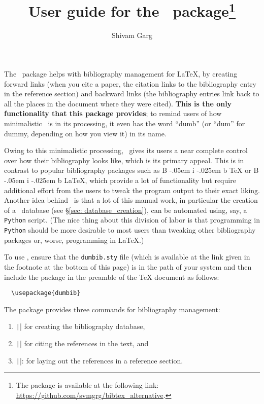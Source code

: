 \documentclass[letter, 12pt]{article}
\title{User guide for the \dumbib\ package\footnote{The package is available at the following link: \url{https://github.com/svmgrg/bibtex_alternative}.}}
\author{Shivam Garg}
\def\Bib{%
  {%
    \rm
    B%
    \kern-.05em%
    {%
      \sc
      i%
      \kern-.025em %
      b%
    }%
  }%
}
\begin{document}
\maketitle

The \dumbib\ package helps with bibliography management for \LaTeX{}, by creating forward links (when you cite a paper, the citation links to the bibliography entry in the reference section) and backward links (the bibliography entries link back to all the places in the document where they were cited). \textbf{This is the only functionality that this package provides}; to remind users of how minimalistic \dumbib\ is in its processing, it even has the word ``dumb'' (or ``dum'' for dummy, depending on how you view it) in its name.

Owing to this minimalistic processing, \dumbib\ gives its users a near complete control over how their bibliography looks like, which is its primary appeal. This is in contrast to popular bibliography packages such as \Bib\TeX{} or \Bib\LaTeX, which provide a lot of functionality but require additional effort from the users to tweak the program output to their exact liking. Another idea behind \dumbib\ is that a lot of this manual work, in particular the creation of a \dumbib\ database (see \S \ref{sec: database_creation}), can be automated using, say, a \texttt{Python} script. (The nice thing about this division of labor is that programming in \texttt{Python} should be more desirable to most users than tweaking other bibliography packages or, worse, programming in \LaTeX.)

To use \dumbib, ensure that the \texttt{dumbib.sty} file (which is available at the link given in the footnote at the bottom of this page) is in the path of your system and then include the package in the preamble of the \TeX{} document as follows:
\begin{verbatim}
  \usepackage{dumbib}
\end{verbatim}
The package provides three commands for bibliography management:
\begin{enumerate}
\item \texttt|\dumbibReferenceEntry{}| for creating the bibliography database,
\item \texttt|\cite{}| for citing the references in the text, and
\item \texttt|\dumbibCreateBibliography|: for laying out the references in a reference section.
\end{enumerate}
\end{document}
